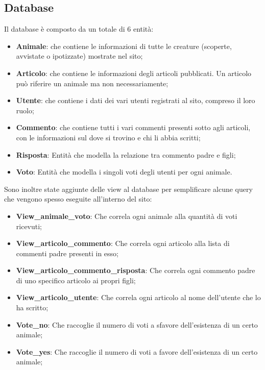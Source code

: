 \clearpage

\subsection{Database}
Il database è composto da un totale di 6 entità:
\begin{itemize}
	\item \textbf{Animale}: che contiene le informazioni di tutte le creature (scoperte, avvistate o ipotizzate) mostrate nel sito;
	\item \textbf{Articolo}: che contiene le informazioni degli articoli pubblicati. Un articolo può riferire un animale ma non necessariamente;
	\item \textbf{Utente}: che contiene i dati dei vari utenti registrati al sito, compreso il loro ruolo;
	\item \textbf{Commento}: che contiene tutti i vari commenti presenti sotto agli articoli, con le informazioni sul dove si trovino e chi li abbia scritti;
	\item \textbf{Risposta}: Entità che modella la relazione tra commento padre e figli;
	\item \textbf{Voto}: Entità che modella  i singoli voti degli utenti per ogni animale.
\end{itemize}
Sono inoltre state aggiunte delle view al database per semplificare alcune query che vengono spesso eseguite all'interno del sito:
\begin{itemize}
	\item \textbf{View\_animale\_voto}: Che correla ogni animale alla quantità di voti ricevuti;
	\item \textbf{View\_articolo\_commento}: Che correla ogni articolo alla lista di commenti padre presenti in esso;
	\item \textbf{View\_articolo\_commento\_risposta}: Che correla ogni commento padre di uno specifico articolo ai propri figli;
	\item \textbf{View\_articolo\_utente}: Che correla ogni articolo al nome dell'utente che lo ha scritto;
	\item \textbf{Vote\_no}: Che raccoglie il numero di voti a sfavore dell'esistenza di un certo animale;
	\item \textbf{Vote\_yes}: Che raccoglie il numero di voti a favore dell'esistenza di un certo animale;
\end{itemize}

